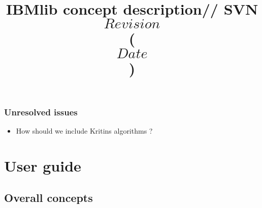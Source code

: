 \title{IBMlib concept description//
       \small{SVN $$Revision$$ ($$Date$$)}}




\maketitle  

\tableofcontents

\section{Unresolved issues}

\begin{itemize}

  \item How should we include Kritins algorithms ?

  
\end{itemize}

\part{User guide }

\chapter{Overall concepts}

